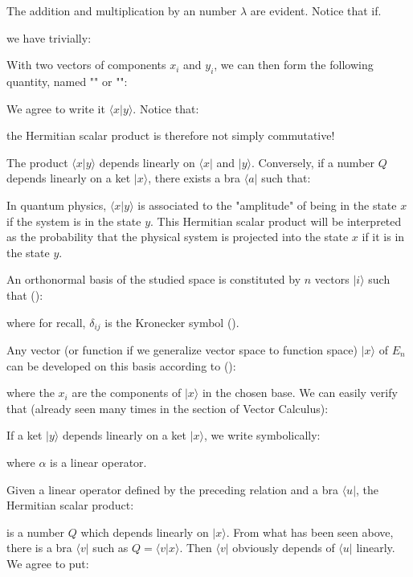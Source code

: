 		The addition and multiplication by an number $\lambda$ are evident. Notice that if.
	
	we have trivially:
	
	
	With two vectors of components $x_i$ and $y_i$, we can then form the following quantity, named "" or "":
	
	We agree to write it $\langle x | y \rangle$. Notice that:
	
	the Hermitian scalar product is therefore not simply commutative!
	
	The product $\langle x|y \rangle$ depends linearly on $\langle x |$ and $|y\rangle$. Conversely, if a number $Q$ depends linearly on a ket $|x\rangle$, there exists a bra $\langle a |$ such that:
	
	In quantum physics, $\langle x|y\rangle$ is associated to the "amplitude" of being in the state $x$ if the system is in the state $y$. This Hermitian scalar product will be interpreted as the probability that the physical system is projected into the state $x$ if it is in the state $y$.

	An orthonormal basis of the studied space is constituted by $n$ vectors $|i\rangle$ such that ():
	
	where for recall, $\delta_{ij}$ is the Kronecker symbol ().

Any vector (or function if we generalize vector space to function space) $|x\rangle$ of $E_n$ can be developed on this basis according to ():
	
	where the $x_i$ are the components of $|x\rangle$ in the chosen base. We can easily verify that (already seen many times in the section of Vector Calculus):
	
	If a ket $|y\rangle$ depends linearly on a ket $|x\rangle$, we write symbolically:
	
	where $\alpha$ is a linear operator. 

	Given a linear operator defined by the preceding relation and a bra $\langle u|$, the Hermitian scalar product:
	
	is a number $Q$ which depends linearly on $|x\rangle$. From what has been seen above, there is a bra $\langle v|$ such as $Q=\langle v|x\rangle$. Then $\langle v|$ obviously depends of $\langle u|$ linearly. We agree to put:
	
